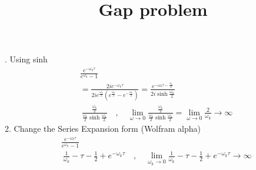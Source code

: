 \documentclass{article}
\begin{document}
\title{Gap problem}
. Using sinh
\begin{align*}
    &\frac{e^{-\omega_k \tau}}{e^{\omega_k}-1}\\
    & = \frac{2i e^{-\omega_k \tau}}{2i e^{\frac{\omega_k}{2}} (e^{\frac{\omega_k}{2}}-e^{-\frac{\omega_k}{2}})} = \frac{e^{-\omega_k \tau - \frac{\omega_k}{2}}}{2i \sinh{\frac{\omega_k}{2}}}\\
    & ~ \frac{\frac{\omega_k}{2}}{\frac{\omega_k}{2}\sinh{\frac{\omega_k}{2}}}\quad , \quad \lim_{\omega \rightarrow 0} \frac{\frac{\omega_k}{2}}{\frac{\omega_k}{2}\sinh{\frac{\omega_k}{2}}} = \lim_{\omega \rightarrow 0} \frac{2}{\omega_k} \rightarrow \infty
\end{align*}
2. Change the Series Expansion form (Wolfram alpha)
\begin{align*}
    &\frac{e^{-\omega_k \tau}}{e^{\omega_k}-1}\\
    & ~ \frac{1}{\omega_k} - \tau - \frac{1}{2} + e^{-\omega_k\tau}\quad , \quad \lim_{\omega_k \rightarrow 0} \frac{1}{\omega_k} - \tau - \frac{1}{2} + e^{-\omega_k\tau} \rightarrow \infty
\end{align*}
\end{document}

